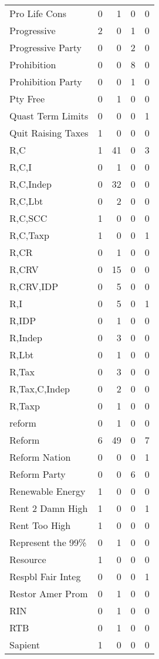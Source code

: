 \begin{supertabular}{lrrrr}
Pro Life Cons & 0 & 1 & 0 & 0\\
Progressive & 2 & 0 & 1 & 0\\
Progressive Party & 0 & 0 & 2 & 0\\
Prohibition & 0 & 0 & 8 & 0\\
Prohibition Party & 0 & 0 & 1 & 0\\
Pty Free & 0 & 1 & 0 & 0\\
Quast Term Limits & 0 & 0 & 0 & 1\\
Quit Raising Taxes & 1 & 0 & 0 & 0\\
R,C & 1 & 41 & 0 & 3\\
R,C,I & 0 & 1 & 0 & 0\\
R,C,Indep & 0 & 32 & 0 & 0\\
R,C,Lbt & 0 & 2 & 0 & 0\\
R,C,SCC & 1 & 0 & 0 & 0\\
R,C,Taxp & 1 & 0 & 0 & 1\\
R,CR & 0 & 1 & 0 & 0\\
R,CRV & 0 & 15 & 0 & 0\\
R,CRV,IDP & 0 & 5 & 0 & 0\\
R,I & 0 & 5 & 0 & 1\\
R,IDP & 0 & 1 & 0 & 0\\
R,Indep & 0 & 3 & 0 & 0\\
R,Lbt & 0 & 1 & 0 & 0\\
R,Tax & 0 & 3 & 0 & 0\\
R,Tax,C,Indep & 0 & 2 & 0 & 0\\
R,Taxp & 0 & 1 & 0 & 0\\
reform & 0 & 1 & 0 & 0\\
Reform & 6 & 49 & 0 & 7\\
Reform Nation & 0 & 0 & 0 & 1\\
Reform Party & 0 & 0 & 6 & 0\\
Renewable Energy & 1 & 0 & 0 & 0\\
Rent 2 Damn High & 1 & 0 & 0 & 1\\
Rent Too High & 1 & 0 & 0 & 0\\
Represent the 99\% & 0 & 1 & 0 & 0\\
Resource & 1 & 0 & 0 & 0\\
Respbl Fair Integ & 0 & 0 & 0 & 1\\
Restor Amer Prom & 0 & 1 & 0 & 0\\
RIN & 0 & 1 & 0 & 0\\
RTB & 0 & 1 & 0 & 0\\
Sapient & 1 & 0 & 0 & 0\\

\end{supertabular}

